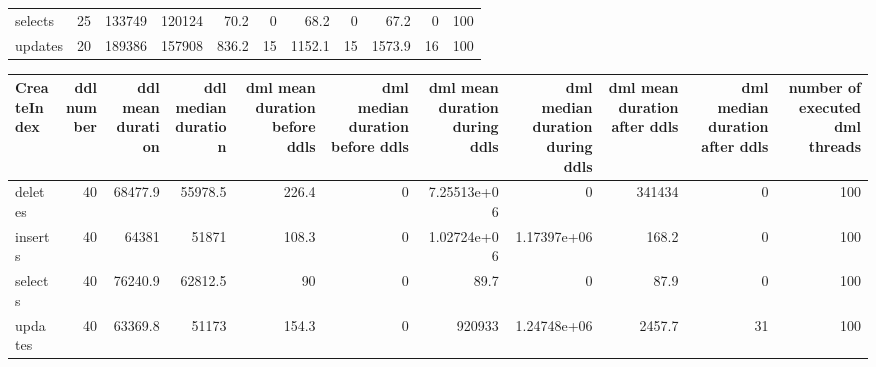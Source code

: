 \begin{tabular}{lrrrrrrrrrr}
 selects             &           25 &              133749 &                120124 &                            70.2 &                                 0 &                            68.2 &                                 0 &                           67.2 &                                0 &                              100 \\
 updates             &           20 &              189386 &                157908 &                           836.2 &                                15 &                          1152.1 &                                15 &                         1573.9 &                               16 &                              100 \\
\hline
\end{tabular}\begin{tabular}{lrrrrrrrrrr}
\hline
 CreateIndex   &   ddl number &   ddl mean duration &   ddl median duration &   dml mean duration before ddls &   dml median duration before ddls &   dml mean duration during ddls &   dml median duration during ddls &   dml mean duration after ddls &   dml median duration after ddls &   number of executed dml threads \\
\hline
 deletes       &           40 &             68477.9 &               55978.5 &                           226.4 &                                 0 &                     7.25513e+06 &                       0           &                       341434   &                                0 &                              100 \\
 inserts       &           40 &             64381   &               51871   &                           108.3 &                                 0 &                     1.02724e+06 &                       1.17397e+06 &                          168.2 &                                0 &                              100 \\
 selects       &           40 &             76240.9 &               62812.5 &                            90   &                                 0 &                    89.7         &                       0           &                           87.9 &                                0 &                              100 \\
 updates       &           40 &             63369.8 &               51173   &                           154.3 &                                 0 &                920933           &                       1.24748e+06 &                         2457.7 &                               31 &                              100 \\

\end{tabular}
